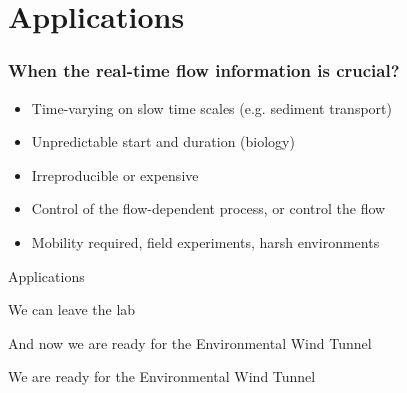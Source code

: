%
% 
%
%
%
%
%

% 

\section{Applications}

\begin{frame}[label=app-110b]
\frametitle{When the real-time flow information is crucial?}
\begin{itemize}
	\item Time-varying on slow time scales (e.g. sediment transport)
    \item Unpredictable start and duration (biology) 
    \item Irreproducible or expensive %
	\item Control of the flow-dependent process, or control the flow %
    \item Mobility required, field experiments, harsh environments
\end{itemize}
\end{frame}

\begin{frame}[label=app-0]{Applications}
\centering{}
\end{frame}

\begin{frame}[label=app-112]{We can leave the lab}
\begin{multicols}{2}
\end{multicols}
\end{frame}


\begin{frame}[label=iibr-4]{And now we are ready for the Environmental Wind Tunnel}
\end{frame}
    
\begin{frame}[label=iibr-44]{We are ready for the Environmental Wind Tunnel}
  \centering{}
\end{frame}
    
